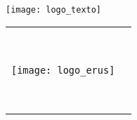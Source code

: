 \begin{titlepage}
\null\vfill
\begin{center}
\large
\sffamily

\bigskip

{\Large\spacedlowsmallcaps{\myName}} \\

\bigskip

\texttt{[image: logo\_texto]}
\smallskip
{\huge\spacedlowsmallcaps{\myTitle} \\
}
\bigskip
    
\vspace{9cm}

\begin{tabular} {cc}
\parbox{0.3\textwidth}{\texttt{[image: logo\_erus]}}
&
\parbox{0.7\textwidth}{{\Large\spacedlowsmallcaps{\mySubTitle}} \\ 

					{\normalsize
					
					\myGroup \\
					\myUrl \\
					\myTime}}
			\end{tabular}
\end{center}
\vfill
\end{titlepage}



